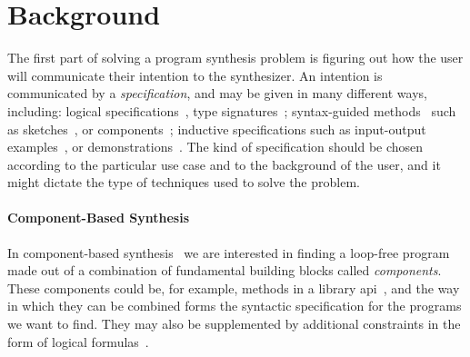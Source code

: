 \section{Background}
\label{sec:background}

The first part of solving a program synthesis problem is figuring out how the
user will communicate their intention to the synthesizer. An intention is
communicated by a \textit{specification}, and may be given in many different
ways, including:
logical specifications~\cite{Itzhaky:SIS:2010},
type signatures~\cite{Osera:2015:TPS,
  Frankle:2016:EST, Polikarpova:2016:PSP};
syntax-guided methods~\cite{Alur:sygus:2013} such as
sketches~\cite{Solar-Lezama:2008}, or components~\cite{Feng:2017:CST,
Feng:2017:CSC, Feng:2018:PSU};
inductive specifications such as input-output examples~\cite{Frankle:2016:EST,
Gulwani:2012:SDM, Leung:2015:IPS}, or demonstrations~\cite{Lau2003}.
The kind of specification should be chosen according to the particular use case
and to the background of the user, and it might dictate the type of techniques
used to solve the problem.

\paragraph{Component-Based Synthesis}
\label{sec:components}

In component-based
synthesis~\cite{Feng:2018:PSU,Feng:2017:CST,Feng:2017:CSC,Jha:oracle:2010}
we are interested in finding a loop-free program made out of a combination of
fundamental building blocks called \textit{components}. These components could
be, for example, methods in a library
\gls{api}~\cite{Feng:2017:CSC}, and the way in which they can be
combined forms the syntactic specification for the programs we want to find.
They may also be supplemented by additional constraints in the form of logical
formulas~\cite{Feng:2018:PSU}.

\paragraph{}

